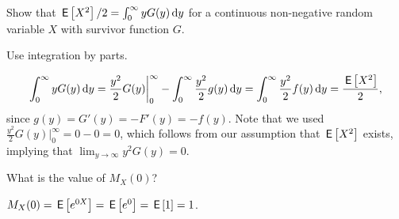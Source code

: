 \documentclass[queueing_book]{subfiles}
\begin{document}
\begin{exercise}\label{ex:l-108}
 Show that $\,\mathsf{E}\left[X^2\right]/2 = \int_0^\infty y G(y) \,\textrm{d}y$ for a continuous non-negative random variable $X$ with survivor function $G$.
 \begin{solution}
 \begin{hint}
 Use integration by parts. 
 \end{hint}
 \begin{equation*}
 \int_0^\infty y G(y) \,\textrm{d}y 
= \frac{y^2}2 G(y) \bigg|_0^\infty - \int_0^\infty \frac{y^2}2 g(y)\,\textrm{d}y = \int_0^\infty \frac{y^2}2 f(y)\,\textrm{d}y = \frac{\,\mathsf{E}\left[X^2\right]}2,
 \end{equation*}
 since $g(y) = G'(y) = - F'(y) = - f(y)$. Note that we used $\frac{y^2}2 G(y) \bigg|_0^\infty = 0 - 0 = 0$, which follows from our assumption that $\,\mathsf{E}\left[X^2\right]$ exists, implying that $\lim_{y \to \infty} y^2G(y) = 0$.
\end{solution}
\end{exercise}



\begin{exercise}
 What is the value of $M_X(0)$?
\begin{solution}
 $M_X(0) = \,\mathsf{E}\left[e^{0 X}\right] = \,\mathsf{E}\left[e^0\right] = \,\mathsf{E}\left[1\right] = 1$.
\end{solution}
\end{exercise}
\end{document}
